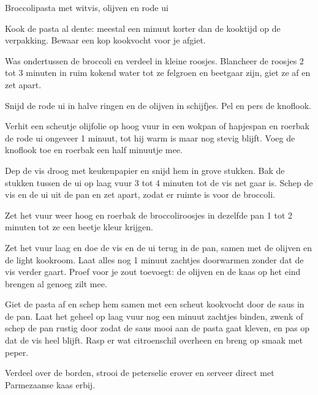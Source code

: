 \begin{recipe}{Broccolipasta met witvis, olijven en rode ui}
\begin{steps}
  \item Kook de pasta al dente: meestal een minuut korter dan de kooktijd op
        de verpakking. Bewaar een kop kookvocht voor je afgiet.
  \item Was ondertussen de broccoli en verdeel in kleine roosjes. Blancheer de
        roosjes 2 tot 3 minuten in ruim kokend water tot ze felgroen en
        beetgaar zijn, giet ze af en zet apart.
  \item Snijd de rode ui in halve ringen en de olijven in schijfjes. Pel en
        pers de knoflook.
  \item Verhit een scheutje olijfolie op hoog vuur in een wokpan of hapjespan
        en roerbak de rode ui ongeveer 1 minuut, tot hij warm is maar nog
        stevig blijft. Voeg de knoflook toe en roerbak een half minuutje mee.
  \item Dep de vis droog met keukenpapier en snijd hem in grove stukken. Bak
        de stukken tussen de ui op laag vuur 3 tot 4 minuten tot de vis net
        gaar is. Schep de vis en de ui uit de pan en zet apart, zodat er
        ruimte is voor de broccoli.
  \item Zet het vuur weer hoog en roerbak de broccoliroosjes in dezelfde pan
        1 tot 2 minuten tot ze een beetje kleur krijgen.
  \item Zet het vuur laag en doe de vis en de ui terug in de pan, samen met de
        olijven en de light kookroom. Laat alles nog 1 minuut zachtjes
        doorwarmen zonder dat de vis verder gaart. Proef voor je zout
        toevoegt: de olijven en de kaas op het eind brengen al genoeg zilt
        mee.
  \item Giet de pasta af en schep hem samen met een scheut kookvocht door de
        saus in de pan. Laat het geheel op laag vuur nog een minuut zachtjes
        binden, zwenk of schep de pan rustig door zodat de saus mooi aan de
        pasta gaat kleven, en pas op dat de vis heel blijft. Rasp er wat
        citroenschil overheen en breng op smaak met peper.
  \item Verdeel over de borden, strooi de peterselie erover en serveer direct
        met Parmezaanse kaas erbij.
\end{steps}
\end{recipe}
